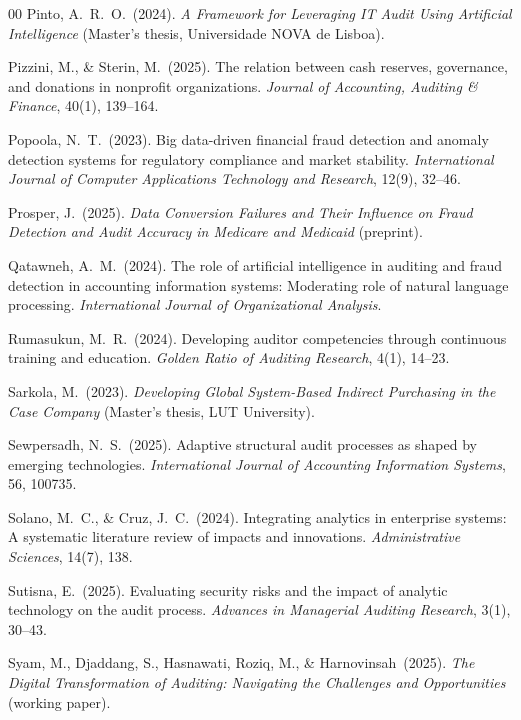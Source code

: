 \documentclass[preprint,12pt]{elsarticle}
\begin{document}
\begin{thebibliography}{00}
 Pinto, A.\ R.\ O.\ (2024). \emph{A Framework for Leveraging IT Audit Using Artificial Intelligence} (Master's thesis, Universidade NOVA de Lisboa).

 Pizzini, M., \& Sterin, M.\ (2025). The relation between cash reserves, governance, and donations in nonprofit organizations. \emph{Journal of Accounting, Auditing \& Finance}, 40(1), 139--164.

 Popoola, N.\ T.\ (2023). Big data-driven financial fraud detection and anomaly detection systems for regulatory compliance and market stability. \emph{International Journal of Computer Applications Technology and Research}, 12(9), 32--46.

 Prosper, J.\ (2025). \emph{Data Conversion Failures and Their Influence on Fraud Detection and Audit Accuracy in Medicare and Medicaid} (preprint).

 Qatawneh, A.\ M.\ (2024). The role of artificial intelligence in auditing and fraud detection in accounting information systems: Moderating role of natural language processing. \emph{International Journal of Organizational Analysis}.

 Rumasukun, M.\ R.\ (2024). Developing auditor competencies through continuous training and education. \emph{Golden Ratio of Auditing Research}, 4(1), 14--23.

 Sarkola, M.\ (2023). \emph{Developing Global System-Based Indirect Purchasing in the Case Company} (Master's thesis, LUT University).

 Sewpersadh, N.\ S.\ (2025). Adaptive structural audit processes as shaped by emerging technologies. \emph{International Journal of Accounting Information Systems}, 56, 100735.

 Solano, M.\ C., \& Cruz, J.\ C.\ (2024). Integrating analytics in enterprise systems: A systematic literature review of impacts and innovations. \emph{Administrative Sciences}, 14(7), 138.

 Sutisna, E.\ (2025). Evaluating security risks and the impact of analytic technology on the audit process. \emph{Advances in Managerial Auditing Research}, 3(1), 30--43.

 Syam, M., Djaddang, S., Hasnawati, Roziq, M., \& Harnovinsah\ (2025). \emph{The Digital Transformation of Auditing: Navigating the Challenges and Opportunities} (working paper).


\end{thebibliography}
\end{document}

